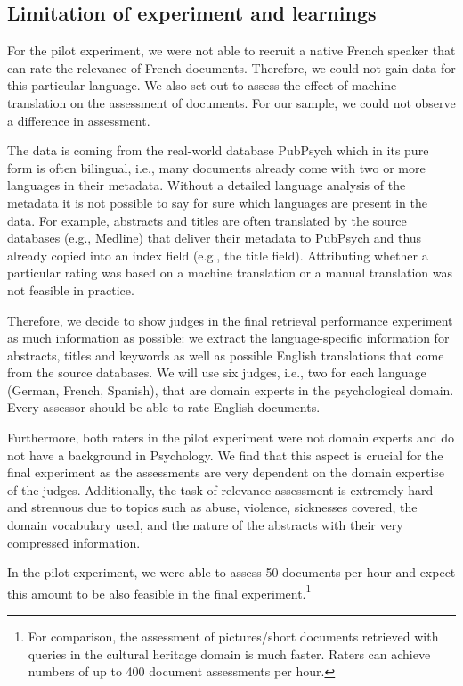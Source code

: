 \documentclass[a4paper,11pt]{article}
\begin{document}
\subsection{Limitation of experiment and learnings}
For the pilot experiment, we were not able to recruit a native French speaker that can rate the relevance of French documents. Therefore, we could not gain data for this particular language. We also set out to assess the effect of machine translation on the assessment of documents. For our sample, we could not observe a difference in assessment. 

The data is coming from the real-world database PubPsych which in its pure form is often bilingual, i.e., many documents already come with two or more languages in their metadata. Without a detailed language analysis of the metadata it is not possible to say for sure which languages are present in the data. For example, abstracts and titles are often translated by the source databases (e.g., Medline) that deliver their metadata to PubPsych and thus already copied into an index field (e.g., the title field). Attributing whether a particular rating was based on a machine translation or a manual translation was not feasible in practice. 

Therefore, we decide to show judges in the final retrieval performance experiment as much information as possible: we extract the language-specific information for abstracts, titles and keywords as well as possible English translations that come from the source databases. We will use six judges, i.e., two for each language (German, French, Spanish), that are domain experts in the psychological domain. Every assessor should be able to rate English documents.

Furthermore, both raters in the pilot experiment were not domain experts and do not have a background in Psychology. We find that this aspect is crucial for the final experiment as the assessments are very dependent on the domain expertise of the judges. Additionally, the task of relevance assessment is extremely hard and strenuous due to topics such as abuse, violence, sicknesses covered, the domain vocabulary used, and the nature of the abstracts with their very compressed information. 

In  the pilot experiment, we were able to assess 50 documents per hour and expect this amount to be also feasible in the final experiment.\footnote{For comparison, the assessment of pictures/short documents retrieved with queries in the cultural heritage domain is much faster. Raters can achieve numbers of up to 400 document assessments per hour.}
\end{document}
